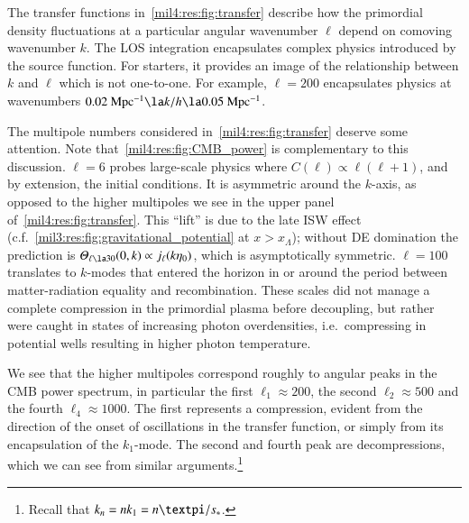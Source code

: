 



The transfer functions in~\cref{mil4:res:fig:transfer} describe how the primordial density fluctuations at a particular angular wavenumber $\ell$ depend on comoving wavenumber $k$. The LOS integration encapsulates complex physics introduced by the source function. For starters, it provides an image of the relationship between $k$ and $\ell$ which is not one-to-one. For example, $\ell=200$ encapsulates physics at wavenumbers $0.02\unit{Mpc^{-1}} \la k/h \la 0.05\unit{Mpc^{-1}}$.

The multipole numbers considered in~\cref{mil4:res:fig:transfer} deserve some attention. Note that~\cref{mil4:res:fig:CMB_power} is complementary to this discussion. $\ell=6$ probes large-scale physics where $C(\ell) \propto \ell(\ell+1)$, and by extension, the initial conditions. It is asymmetric around the $k$-axis, as opposed to the higher multipoles we see in the upper panel of~\cref{mil4:res:fig:transfer}. This ``lift'' is due to the late ISW effect (c.f.~\cref{mil3:res:fig:gravitational_potential} at $x>x_\Lambda$); without DE domination the prediction is $\Theta_{\ell\la 30}(0, k)\propto j_\ell(k\eta_0)$, which is asymptotically symmetric. $\ell=100$ translates to $k$-modes that entered the horizon in or around the period between matter-radiation equality and recombination. These scales did not manage a complete compression in the primordial plasma before decoupling, but rather were caught in states of increasing photon overdensities, i.e.~compressing in potential wells resulting in higher photon temperature.  

We see that the higher multipoles correspond roughly to angular peaks in the CMB power spectrum, in particular the first $\ell_1 \approx 200$, the second $\ell_2 \approx 500$ and the fourth $\ell_4\approx 1000$. The first represents a compression, evident from the direction of the onset of oscillations in the transfer function, or simply from its encapsulation of the $k_1$-mode. The second and fourth peak are decompressions, which we can see from similar arguments.\footnote{Recall that $k_n=nk_1=n\pi/\sh$.} 



